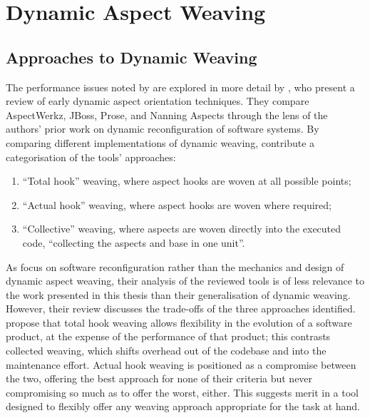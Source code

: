 \section{Dynamic Aspect Weaving}\label{sec:dynamic_aop_review}



\subsection{Approaches to Dynamic Weaving}


The performance issues noted by \citeauthor{popovici2003JITaspects} are explored
 in more detail by
\citet{dynamicAOchitchyan}, who present a review of early dynamic aspect
orientation techniques. They compare AspectWerkz, JBoss, Prose, and Nanning
Aspects through the lens of the authors' prior work on dynamic reconfiguration
of software systems. By comparing different implementations of dynamic
weaving, \citeauthor{dynamicAOchitchyan} contribute a categorisation of the tools'
approaches: 

\begin{enumerate}
\item ``Total hook'' weaving, where aspect hooks are woven at all possible
points;
\item ``Actual hook'' weaving, where aspect hooks are woven where required;
\item ``Collective'' weaving, where aspects are woven directly into the executed
code, ``collecting the aspects and base in one unit''.
\end{enumerate}

As \citeauthor{dynamicAOchitchyan} focus on software reconfiguration rather than
the mechanics and design of dynamic aspect weaving, their analysis of the
reviewed tools is of less relevance to the work presented in this thesis than
their generalisation of dynamic weaving. However, their review discusses the
trade-offs of the three approaches identified. \citeauthor{dynamicAOchitchyan}
propose that total hook weaving allows flexibility in the evolution of a
software product, at the expense of the performance of that product; this
contrasts collected weaving, which shifts overhead out of the codebase and into
the maintenance effort. Actual hook weaving is positioned as a compromise
between the two, offering the best approach for none of their criteria but never
compromising so much as to offer the worst, either. This suggests merit in a
tool designed to flexibly offer any weaving approach appropriate for the task at
hand.

